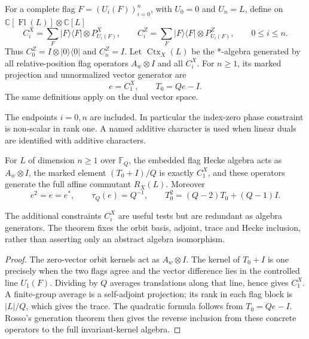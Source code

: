 \begin{definition}
For a complete flag $F=(U_i(F))_{i=0}^n$, with $U_0=0$ and $U_n=L$, define
on $\mathbb C[\operatorname{Fl}(L)]\otimes\mathbb C[L]$
\[
 C_i^X=\sum_F|F\rangle\!\langle F|\otimes P_{U_i(F)}^X,
 \qquad
 C_i^Z=\sum_F|F\rangle\!\langle F|\otimes P_{U_i(F)}^Z,
 \qquad 0\leq i\leq n.
\]
Thus $C_0^Z=I\otimes|0\rangle\!\langle0|$ and $C_n^Z=I$.  Let
$\operatorname{Ctx}_X(L)$ be the *-algebra generated by all relative-position
flag operators $A_w\otimes I$ and all $C_i^X$.  For $n\geq1$, its marked
projection and unnormalized vector generator are
\[
 e=C_1^X,\qquad T_0=Qe-I.
\]
The same definitions apply on the dual vector space.
\end{definition}
\begin{scope}
The endpoints $i=0,n$ are included.  In particular the index-zero phase
constraint is non-scalar in rank one.  A named additive character is used
when linear duals are identified with additive characters.
\end{scope}

\begin{theorem}
{\normalfont\statusProved}\quad
For $L$ of dimension $n\geq1$ over $\mathbb F_Q$, the embedded flag Hecke
algebra acts as $A_w\otimes I$, the marked element
$(T_0+I)/Q$ is exactly $C_1^X$, and these operators generate the full affine
commutant $R_X(L)$.  Moreover
\[
 e^2=e=e^*,\qquad \tau_Q(e)=Q^{-1},\qquad
 T_0^2=(Q-2)T_0+(Q-1)I.
\]
\end{theorem}
\begin{scope}
The additional constraints $C_i^X$ are useful tests but are redundant as
algebra generators.  The theorem fixes the orbit basis, adjoint, trace and
Hecke inclusion, rather than asserting only an abstract algebra isomorphism.
\end{scope}
\begin{proof}
The zero-vector orbit kernels act as $A_w\otimes I$.  The kernel of
$T_0+I$ is one precisely when the two flags agree and the vector difference
lies in the controlled line $U_1(F)$.  Dividing by $Q$ averages translations
along that line, hence gives $C_1^X$.  A finite-group average is a
self-adjoint projection; its rank in each flag block is $|L|/Q$, which gives
the trace.  The quadratic formula follows from $T_0=Qe-I$.  Rosso's
generation theorem then gives the reverse inclusion from these concrete
operators to the full invariant-kernel algebra.
\end{proof}

